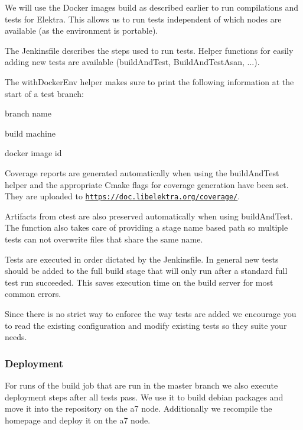 We will use the Docker images build as described earlier to run compilations and tests for Elektra. This allows us to run tests independent of which nodes are available (as the environment is portable).

The Jenkinsfile describes the steps used to run tests. Helper functions for easily adding new tests are available (build\+And\+Test, Build\+And\+Test\+Asan, ...).

The {\ttfamily with\+Docker\+Env} helper makes sure to print the following information at the start of a test branch\+:


\begin{DoxyItemize}
\item branch name
\item build machine
\item docker image id
\end{DoxyItemize}

Coverage reports are generated automatically when using the build\+And\+Test helper and the appropriate Cmake flags for coverage generation have been set. They are uploaded to \href{https://doc.libelektra.org/coverage/}{\tt https\+://doc.\+libelektra.\+org/coverage/}.

Artifacts from {\ttfamily ctest} are also preserved automatically when using build\+And\+Test. The function also takes care of providing a stage name based path so multiple tests can not overwrite files that share the same name.

Tests are executed in order dictated by the Jenkinsfile. In general new tests should be added to the \textquotesingle{}full build stage\textquotesingle{} that will only run after a standard full test run succeeded. This saves execution time on the build server for most common errors.

Since there is no strict way to enforce the way tests are added we encourage you to read the existing configuration and modify existing tests so they suite your needs.

\subsubsection*{Deployment}

For runs of the build job that are run in the master branch we also execute deployment steps after all tests pass. We use it to build debian packages and move it into the repository on the a7 node. Additionally we recompile the homepage and deploy it on the a7 node.

